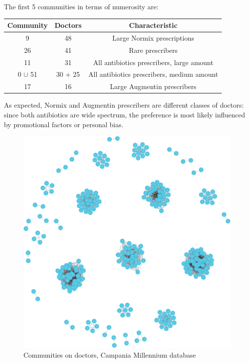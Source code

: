 The first 5 communities in terms of numerosity are:
\begin{center}
	\begin{tabular}{c|c|c}
		Community & Doctors  & Characteristic \\
		\hline
		9 & 48 & Large Normix prescriptions \\
		\hline
		26 & 41 & Rare prescribers \\
		\hline
		11 & 31 & All antibiotics prescribers, large amount \\
		\hline
		0 $\cup$ 51 & 30 + 25 & All antibiotics prescribers, medium amount \\
		\hline
		17 & 16 & Large Augmentin prescribers \\
		\hline
	\end{tabular}
\end{center}
\medskip
As expected, Normix and Augmentin prescribers are different classes of doctors: since both antibiotics are wide spectrum, the preference is most likely influenced by promotional factors or personal bias.
\medskip
\begin{figure}[h]
	\centering
	\includegraphics[scale=0.11]{./images/community-doctors.png}
	\caption{\small Communities on doctors, Campania Millennium database}
\end{figure}

